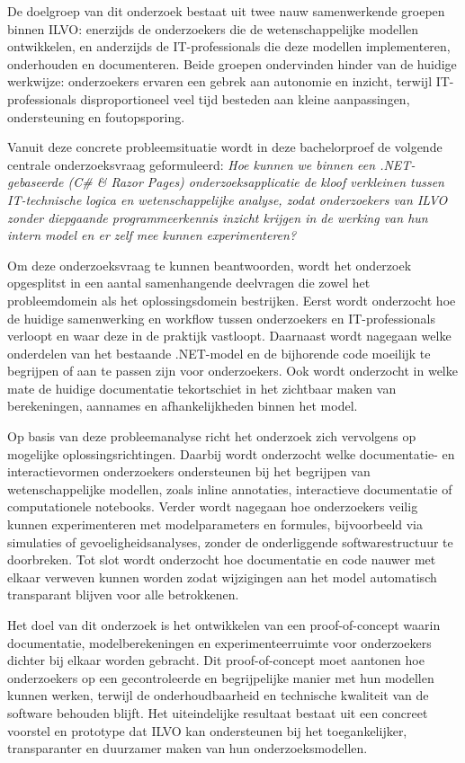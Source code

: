 De doelgroep van dit onderzoek bestaat uit twee nauw samenwerkende groepen binnen ILVO: enerzijds de onderzoekers die de wetenschappelijke modellen ontwikkelen, en anderzijds de IT-professionals die deze modellen implementeren, onderhouden en documenteren. Beide groepen ondervinden hinder van de huidige werkwijze: onderzoekers ervaren een gebrek aan autonomie en inzicht, terwijl IT-professionals disproportioneel veel tijd besteden aan kleine aanpassingen, ondersteuning en foutopsporing.

Vanuit deze concrete probleemsituatie wordt in deze bachelorproef de volgende centrale onderzoeksvraag geformuleerd:
\textit{Hoe kunnen we binnen een .NET-gebaseerde (C\# \& Razor Pages) onderzoeksapplicatie de kloof verkleinen tussen IT-technische logica en wetenschappelijke analyse, zodat onderzoekers van ILVO zonder diepgaande programmeerkennis inzicht krijgen in de werking van hun intern model en er zelf mee kunnen experimenteren?}

Om deze onderzoeksvraag te kunnen beantwoorden, wordt het onderzoek opgesplitst in een aantal samenhangende deelvragen die zowel het probleemdomein als het oplossingsdomein bestrijken. Eerst wordt onderzocht hoe de huidige samenwerking en workflow tussen onderzoekers en IT-professionals verloopt en waar deze in de praktijk vastloopt. Daarnaast wordt nagegaan welke onderdelen van het bestaande .NET-model en de bijhorende code moeilijk te begrijpen of aan te passen zijn voor onderzoekers. Ook wordt onderzocht in welke mate de huidige documentatie tekortschiet in het zichtbaar maken van berekeningen, aannames en afhankelijkheden binnen het model.

Op basis van deze probleemanalyse richt het onderzoek zich vervolgens op mogelijke oplossingsrichtingen. Daarbij wordt onderzocht welke documentatie- en interactievormen onderzoekers ondersteunen bij het begrijpen van wetenschappelijke modellen, zoals inline annotaties, interactieve documentatie of computationele notebooks. Verder wordt nagegaan hoe onderzoekers veilig kunnen experimenteren met modelparameters en formules, bijvoorbeeld via simulaties of gevoeligheidsanalyses, zonder de onderliggende softwarestructuur te doorbreken. Tot slot wordt onderzocht hoe documentatie en code nauwer met elkaar verweven kunnen worden zodat wijzigingen aan het model automatisch transparant blijven voor alle betrokkenen.

Het doel van dit onderzoek is het ontwikkelen van een proof-of-concept waarin documentatie, modelberekeningen en experimenteerruimte voor onderzoekers dichter bij elkaar worden gebracht. Dit proof-of-concept moet aantonen hoe onderzoekers op een gecontroleerde en begrijpelijke manier met hun modellen kunnen werken, terwijl de onderhoudbaarheid en technische kwaliteit van de software behouden blijft. Het uiteindelijke resultaat bestaat uit een concreet voorstel en prototype dat ILVO kan ondersteunen bij het toegankelijker, transparanter en duurzamer maken van hun onderzoeksmodellen.

